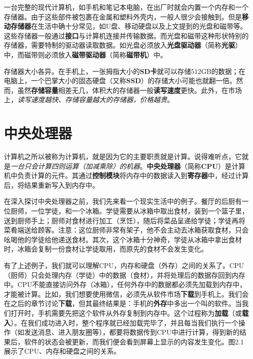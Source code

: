 一台完整的现代计算机，如手机和笔记本电脑，在出厂时就会内置一个内存和一个存储器。由于这些部件被包裹在金属和塑料外壳内，一般人很少会接触到。但是\textbf{移动存储器}在生活中确十分常见，如U盘、移动硬盘以及上文提到的光盘和磁带等。这些存储器一般通过\textbf{接口}与计算机连接并传输数据。而光盘和磁带这种形状特别的存储器，需要特制的驱动器读取数据。如光盘必须放入\textbf{光盘驱动器}（简称\textbf{光驱}）中，而磁带则必须放入\textbf{磁带驱动器}（简称\textbf{磁带机}）中。

存储器大小各异。在手机上，一张拇指大小的\textbf{SD卡}就可以存储512GB的数据；在电脑上，一个巴掌大小的固态硬盘（又称\textbf{SSD}）的存储大小可能也就翻一倍。然而，虽然\textbf{存储容量}相差无几，体积大的存储器一般\textbf{读写速度}更快。此外，在市场上，\textit{读写速度越快、存储容量越大的存储器，价格越贵}。


\section{中央处理器}\label{sec:arch:cpu}

计算机之所以被称为计算机，就是因为它的主要职责就是计算。说得难听点，它就是\textit{一台只会计算四则运算（加减乘除）的机器}。\textbf{中央处理器}（简称\textbf{CPU}）是计算机中负责计算的元件。其通过\textbf{控制模块}将内存中的数据读入到\textbf{寄存器}中，经过计算后，将结果重新写入到内存中。

在深入探讨中央处理器之前，我们先来看一个现实生活中的例子。餐厅的后厨有一位厨师，一位学徒，和一个冰箱。学徒需要从冰箱中取出食材，装到一个篮子里，送到厨师手上；厨师对食材进行加工（烹饪），随后将菜品呈递给学徒；学徒再将菜肴端送给顾客。注意：这位厨师非常有架子，他不会主动去冰箱获取食材，只会吆喝他的学徒给他递送食材。其次，这个冰箱十分神奇，学徒从冰箱中拿出食材时，冰箱会复制一份食材让学徒取用，而原先的食材不会发生变化。

有了上述例子，我们就可以理解CPU，内存和硬盘（外存）之间的关系了。CPU（厨师）只会处理内存（学徒）中的数据（食材），并将处理后的数据存回到内存中。CPU不能直接访问外存（冰箱），任何外存中的数据都必须先加载到内存中，才能被计算。比如，我们想要使用微信，必须先从软件市场\textbf{下载}到手机上。我们会在之后的章节讨论\textbf{下载}，但其最终结果是：手机的\textbf{外存}中多出一个叫的软件。当我们打开时，手机需要先把这个软件从外存复制到内存中。这个过程称为\textbf{加载}（或\textbf{载入}）。在我们成功进入时，整个程序就已经加载完毕了，并且每当我们执行一个操作（如发送消息、进入朋友圈等），都要将数据传到CPU中进行计算，得到新的结果后，软件的状态会被更新，而我们便会看到屏幕上显示的内容发生变化。图2.1展示了CPU、内存和硬盘之间的关系。

